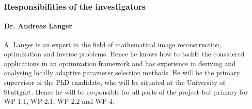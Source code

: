 \documentclass[enabledeprecatedfontcommands,cleardoublepage=empty,headsepline,twoside,11pt,DIV=15,BCOR=12mm,final]{scrartcl}
\begin{document}


\subsubsection{Responsibilities of the investigators}

\paragraph{Dr. Andreas Langer}  
A. Langer is an expert in the field of mathematical image reconstruction, optimization and inverse problems. Hence he knows how to tackle the considered applications in an optimization framework and has experience in deriving and analysing locally adaptive parameter selection methods. He will be the primary supervisor of the PhD candidate, who will be situated at the University of Stuttgart. Hence he will be responsible for all parts of the project but primary for WP 1.1, WP 2.1, WP 2.2 and WP 4. %
\end{document}

